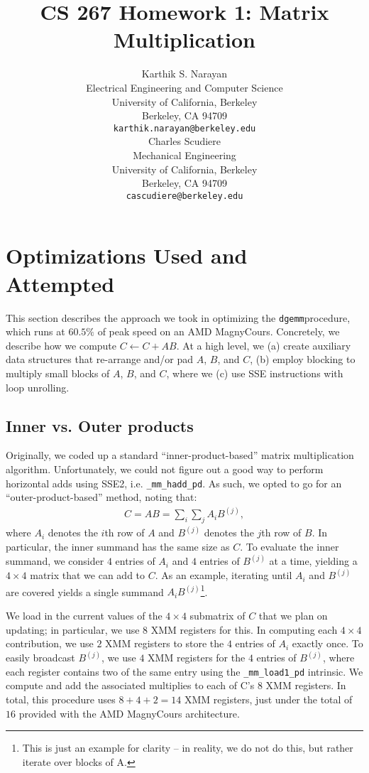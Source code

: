 \documentclass{article} %
\title{CS 267 Homework 1: Matrix Multiplication}
\author{
Karthik S. Narayan \\
Electrical Engineering and Computer Science\\
University of California, Berkeley\\
Berkeley, CA 94709 \\
\texttt{karthik.narayan@berkeley.edu} \\
\And
Charles Scudiere \\
Mechanical Engineering\\
University of California, Berkeley\\
Berkeley, CA 94709 \\
\texttt{cascudiere@berkeley.edu} \\
}
\begin{document}
\newcommand{\dgemm}{\texttt{dgemm}}

\newcommand\todo{\textcolor{red}{TODO}}
\newcommand\tocite{\textcolor{red}{CITE}}

\maketitle

\section{Optimizations Used and Attempted}
This section describes the approach we took in optimizing the \dgemm procedure,
which runs at $60.5\%$ of peak speed on an AMD MagnyCours.
Concretely, we describe how we compute $C \leftarrow C + AB$. At a high level,
we (a) create auxiliary data structures that re-arrange and/or pad $A$, $B$,
and $C$, (b) employ blocking to multiply small blocks of $A$, $B$, and $C$,
where we (c) use SSE instructions with loop unrolling.

\subsection{Inner vs. Outer products}
\label{sec:ioproducts}
Originally, we coded up a standard ``inner-product-based'' matrix multiplication
algorithm. Unfortunately, we could not figure out a good way to perform
horizontal adds using SSE2, i.e. \texttt{\_mm\_hadd\_pd}. As such, we opted to go
for an ``outer-product-based'' method, noting that:
\begin{align}
  \label{eq:matmul}
  C = AB = \sum_{i}\sum_{j}A_i B^{(j)},
\end{align}
where $A_i$ denotes the $i$th row of $A$ and $B^{(j)}$ denotes the $j$th row of
$B$. In particular, the inner summand has the same size as $C$. To evaluate the
inner summand, we consider $4$ entries of $A_i$ and $4$ entries of $B^{(j)}$ at
a time, yielding a $4\times 4$ matrix that we can add to $C$. As an example,
iterating until $A_i$ and $B^{(j)}$ are covered yields a single summand
$A_i B^{(j)}$\footnote{This is just an example for clarity -- in reality, we do
  not do this, but rather iterate over blocks of A.}.

We load in the current values of the $4\times 4$ submatrix of $C$ that we
plan on updating; in particular, we use $8$ XMM registers for this.
In computing each $4\times 4$ contribution, we use $2$ XMM registers to store
the $4$ entries of $A_i$ exactly once. To easily broadcast $B^{(j)}$, we use
$4$ XMM registers for the $4$ entries of $B^{(j)}$, where each register contains
two of the same entry using the \texttt{\_mm\_load1\_pd} intrinsic. We compute
and add the associated multiplies to each of C's $8$ XMM registers. In total,
this procedure uses $8 + 4 + 2 = 14$ XMM registers, just under the total of $16$
provided with the AMD MagnyCours architecture.
\end{document}
